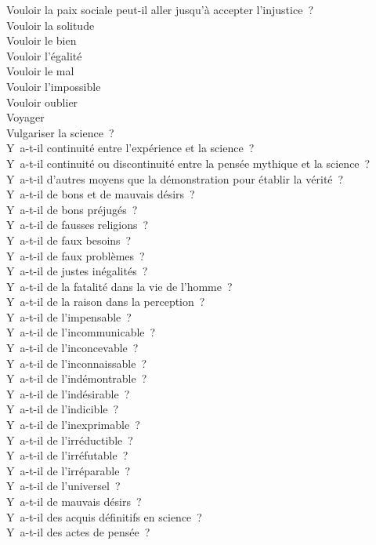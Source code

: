 \documentclass[a4paper,12pt]{article}
\begin{document}
Vouloir la paix sociale peut-il aller jusqu'à accepter l'injustice ? \\
Vouloir la solitude \\
Vouloir le bien \\
Vouloir l'égalité \\
Vouloir le mal \\
Vouloir l'impossible \\
Vouloir oublier \\
Voyager \\
Vulgariser la science ? \\
Y a-t-il continuité entre l'expérience et la science ? \\
Y a-t-il continuité ou discontinuité entre la pensée mythique et la science ? \\
Y a-t-il d'autres moyens que la démonstration pour établir la vérité ? \\
Y a-t-il de bons et de mauvais désirs ? \\
Y a-t-il de bons préjugés ? \\
Y a-t-il de fausses religions ? \\
Y a-t-il de faux besoins ? \\
Y a-t-il de faux problèmes ? \\
Y a-t-il de justes inégalités ? \\
Y a-t-il de la fatalité dans la vie de l'homme ? \\
Y a-t-il de la raison dans la perception ? \\
Y a-t-il de l'impensable ? \\
Y a-t-il de l'incommunicable ? \\
Y a-t-il de l'inconcevable ? \\
Y a-t-il de l'inconnaissable ? \\
Y a-t-il de l'indémontrable ? \\
Y a-t-il de l'indésirable ? \\
Y a-t-il de l'indicible ? \\
Y a-t-il de l'inexprimable ? \\
Y a-t-il de l'irréductible ? \\
Y a-t-il de l'irréfutable ? \\
Y a-t-il de l'irréparable ? \\
Y a-t-il de l'universel ? \\
Y a-t-il de mauvais désirs ? \\
Y a-t-il des acquis définitifs en science ? \\
Y a-t-il des actes de pensée ? \\
\end{document}
